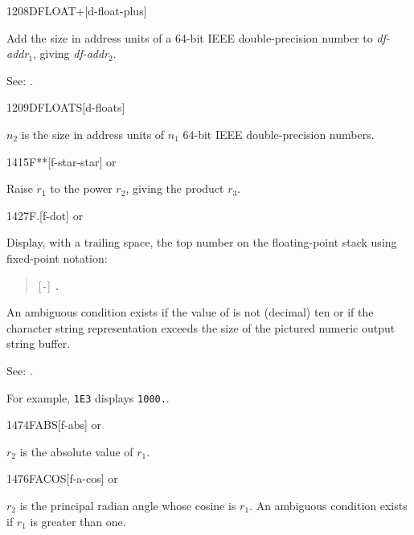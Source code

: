 \begin{newword}{1208}{DFLOAT+}[d-float-plus]

	Add the size in address units of a 64-bit IEEE double-precision
	number to \emph{df-addr}$_1$, giving \emph{df-addr}$_2$.

\item[See:]
	.
\end{newword}


\begin{newword}{1209}{DFLOATS}[d-floats]

	$n_2$ is the size in address units of $n_1$ 64-bit IEEE
	double-precision numbers.
\end{newword}


\begin{newword}{1415}{F**}[f-star-star]
	 or

	Raise $r_1$ to the power $r_2$, giving the product $r_3$.
\end{newword}


\begin{newword}{1427}{F.}[f-dot]
	\stack{}{}  or

	Display, with a trailing space, the top number on the
	floating-point stack using fixed-point notation:
	\begin{quote}
		[\texttt{-}] \texttt{.}
	\end{quote}
	An ambiguous condition exists if the value of 
	is not (decimal) ten or if the character string representation
	exceeds the size of the pictured numeric output string buffer.

\item[See:]
	.

	\begin{rationale} %
		For example, \texttt{1E3}  displays \texttt{1000.}.
	\end{rationale}
\end{newword}


\begin{newword}{1474}{FABS}[f-abs]
	 or

	$r_2$ is the absolute value of $r_1$.
\end{newword}


\begin{newword}{1476}{FACOS}[f-a-cos]
	 or

	$r_2$ is the principal radian angle whose cosine is $r_1$. An
	ambiguous condition exists if {\textbar}$r_1${\textbar} is
	greater than one.
\end{newword}


